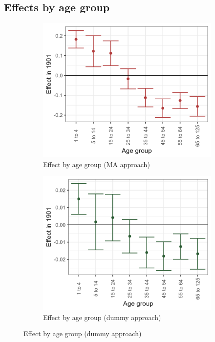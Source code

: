 \FloatBarrier
\subsection{Effects by age group} 
\begin{figure}
    \centering
    \caption{Age group composition}
    \begin{subfigure}[b]{0.45\textwidth}
        \centering
        \caption{Effect by age group (MA approach)} \label{fig:migr}
        \includegraphics[width=\textwidth]{Plots/Mechanism/Age_composition_MA.png}
    \end{subfigure}
    \hfill
    \begin{subfigure}[b]{0.45\textwidth}
        \centering
        \caption{Effect by age group (dummy approach)} \label{fig:fert}
        \includegraphics[width=\textwidth]{Plots/Mechanism/Age_composition_Dummy.png}

\end{subfigure}
\end{figure}
